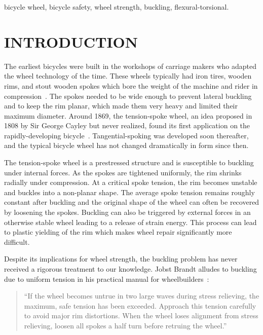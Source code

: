 \documentclass{bmd2016p}
\begin{document}
\begin{keywords}
bicycle wheel, 
bicycle safety, 
wheel strength, 
buckling, 
flexural-torsional.
\end{keywords}



\section{INTRODUCTION}
The earliest bicycles were built in the workshops of carriage makers who adapted the wheel technology of the time. These wheels typically had iron tires, wooden rims, and stout wooden spokes which bore the weight of the machine and rider in compression~\cite{Herlihy2004}. The spokes needed to be wide enough to prevent lateral buckling and to keep the rim planar, which made them very heavy and limited their maximum diameter. Around 1869, the tension-spoke wheel, an idea proposed in 1808 by Sir George Cayley but never realized, found its first application on the rapidly-developing bicycle~\cite{Ackroyd2011a,Clayton1991b}. Tangential-spoking was developed soon thereafter, and the typical bicycle wheel has not changed dramatically in form since then.

The tension-spoke wheel is a prestressed structure and is susceptible to buckling under internal forces. As the spokes are tightened uniformly, the rim shrinks radially under compression. At a critical spoke tension, the rim becomes unstable and buckles into a non-planar shape. The average spoke tension remains roughly constant after buckling and the original shape of the wheel can often be recovered by loosening the spokes. Buckling can also be triggered by external forces in an otherwise stable wheel leading to a release of strain energy. This process can lead to plastic yielding of the rim which makes wheel repair significantly more difficult.

Despite its implications for wheel strength, the buckling problem has never received a rigorous treatment to our knowledge. Jobst Brandt alludes to buckling due to uniform tension in his practical manual for wheelbuilders~\cite{Brandt1993c}:

\begin{quotation}
\noindent``If the wheel becomes untrue in two large waves during stress relieving, the maximum, safe tension has been exceeded. Approach this tension carefully to avoid major rim distortions. When the wheel loses alignment from stress relieving, loosen all spokes a half turn before retruing the wheel.''
\end{quotation}
\end{document}
